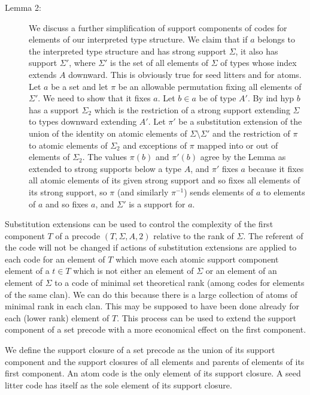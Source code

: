 \documentclass{article}
\begin{document}
\begin{description}
\item[Lemma 2:]  We discuss a further simplification of support components of codes for elements of our interpreted type structure.  We claim that if $a$ belongs to the interpreted type structure
and has strong support $\Sigma$, it also has support $\Sigma'$, where $\Sigma'$ is the set of all elements of $\Sigma$ of types whose index extends $A$ downward.   This is obviously true for seed litters and for atoms.   Let $a$ be a set and let $\pi$ be an allowable permutation fixing all elements of $\Sigma'$.   We need to show that it fixes $a$.   Let $b \in a$ be of type $A'$.  By ind hyp $b$ has a support $\Sigma_2$ which is the restriction of a strong support extending $\Sigma$ to types downward extending $A'$.  Let $\pi'$
be a substitution extension of the union of the identity on atomic elements of $\Sigma \setminus \Sigma'$ and the restriction of $\pi$ to atomic elements of $\Sigma_2$ and exceptions of $\pi$ mapped into or out of elements of $\Sigma_2$.   The values $\pi(b)$ and $\pi'(b)$ agree by the Lemma as extended to strong supports below a type $A$, and $\pi'$ fixes $a$
because it fixes all atomic elements of its given strong support and so fixes all elements of its strong support, so $\pi$ (and similarly $\pi^{-1}$) sends elements of $a$ to elements of $a$ and so fixes $a$, and $\Sigma'$ is a support for $a$.

\end{description}

Substitution extensions can be used to control the complexity of the first component $T$ of a precode $(T,\Sigma,A,2)$ relative to the rank of $\Sigma$.  The referent of the code will not be changed if
actions of substitution extensions are applied to each code for an element of $T$ which move each atomic support component element of a $t \in T$ which is not either an element of $\Sigma$ or
an element of an element of $\Sigma$ to a code of minimal set theoretical rank (among codes for elements of the same clan).   We can do this because there is a large collection of atoms of minimal rank in each clan.  This may be supposed to have been done already for each (lower rank) element of $T$.   This process can be used to extend the support component of a set precode with a more economical effect on the first component.

We define the support closure of a set precode as the union of its support component and the support closures of all elements and parents of elements of its first component.  An atom code is the only element of its support closure.   A seed litter code has itself as the sole element of its support closure.
\end{document}
